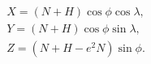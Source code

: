 \documentclass[10pt]{article}
\begin{document}
\begin{align*}&  X = (N + H) \cos \phi \cos \lambda, \\
&  Y = (N + H) \cos \phi \sin \lambda, \\
&  Z = (N + H - e^2 N ) \sin \phi .\end{align*}
\end{document}
